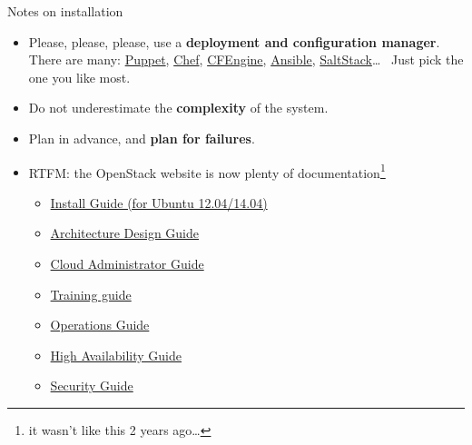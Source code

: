 \documentclass[english,serif,mathserif,usenames,dvipsnames]{beamer}
\begin{document}
\begin{frame}
  {Notes on installation}

  \begin{itemize}
  \item Please, please, please, use a \textbf{deployment and
      configuration manager}. There are many:
    \href{http://puppetlabs.com/}{Puppet},
    \href{http://www.getchef.com/}{Chef},
    \href{http://cfengine.com/}{CFEngine},
    \href{http://www.ansible.com/home}{Ansible},
    \href{http://www.saltstack.com/}{SaltStack}\ldots~ Just pick the
    one you like most.
  \item Do not underestimate the \textbf{complexity} of the system.
  \item Plan in advance, and \textbf{plan for failures}.
  \item RTFM: the OpenStack website is now plenty of
    documentation\footnote{\scriptsize it wasn't like this 2 years ago\ldots}
    \begin{itemize}
    \item
      \href{http://docs.openstack.org/icehouse/install-guide/install/apt/content/index.html}{Install
        Guide (for Ubuntu 12.04/14.04)}
    \item
      \href{http://docs.openstack.org/arch-design/content/index.html}{Architecture
        Design Guide}
    \item
      \href{http://docs.openstack.org/admin-guide-cloud/content/}{Cloud
        Administrator Guide}
    \item
      \href{http://docs.openstack.org/training-guides/content/}{Training guide}
    \item \href{http://docs.openstack.org/openstack-ops/content/}{Operations Guide}
    \item
      \href{http://docs.openstack.org/high-availability-guide/content/index.html}{High
        Availability Guide}
    \item
      \href{http://docs.openstack.org/security-guide/content/}{Security Guide}
    \end{itemize}
  \end{itemize}

\end{frame}
\end{document}

